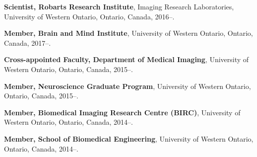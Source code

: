 \begin{description}
    
\item \textbf{Scientist, Robarts Research Institute}, Imaging Research Laboratories, University of Western Ontario, Ontario, Canada, 2016–.

\item \textbf{Member, Brain and Mind Institute}, University of Western Ontario, Ontario, Canada, 2017–.

\item \textbf{Cross-appointed Faculty, Department of Medical Imaging}, University of Western Ontario, Ontario, Canada,  2015–.

\item \textbf{Member, Neuroscience Graduate Program}, University of Western Ontario, Ontario, Canada, 2015–.

\item \textbf{Member, Biomedical Imaging Research Centre (BIRC)}, University of Western Ontario, Ontario, Canada, 2014–.

\item \textbf{Member, School of Biomedical Engineering}, University of Western Ontario, Ontario, Canada, 2014–.


\end{description}

